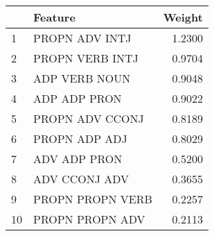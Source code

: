 \begin{tabular}{llr}
\toprule
{} &           Feature &  Weight \\
\midrule
1  &    PROPN ADV INTJ &  1.2300 \\
2  &   PROPN VERB INTJ &  0.9704 \\
3  &     ADP VERB NOUN &  0.9048 \\
4  &      ADP ADP PRON &  0.9022 \\
5  &   PROPN ADV CCONJ &  0.8189 \\
6  &     PROPN ADP ADJ &  0.8029 \\
7  &      ADV ADP PRON &  0.5200 \\
8  &     ADV CCONJ ADV &  0.3655 \\
9  &  PROPN PROPN VERB &  0.2257 \\
10 &   PROPN PROPN ADV &  0.2113 \\
\bottomrule
\end{tabular}
